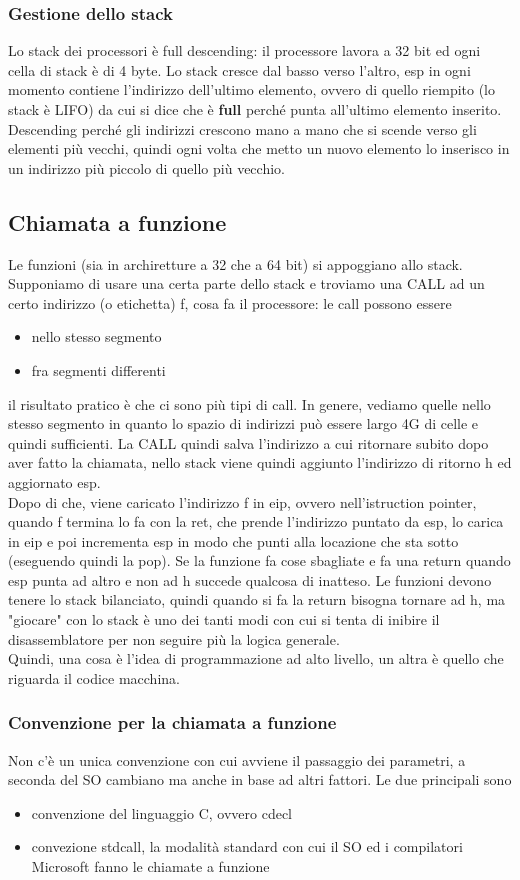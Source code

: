 \documentclass{article}
\begin{document}
\subsubsection{Gestione dello stack}
Lo stack dei processori è full descending: il processore lavora a 32 bit ed ogni cella di stack è di 4 byte. Lo stack cresce dal basso verso l'altro, esp in ogni momento contiene l'indirizzo dell'ultimo elemento, ovvero di quello riempito (lo stack è LIFO) da cui si dice che è \textbf{full} perché punta all'ultimo elemento inserito. Descending perché gli indirizzi crescono mano a mano che si scende verso gli elementi più vecchi, quindi ogni volta che metto un nuovo elemento lo inserisco in un indirizzo più piccolo di quello più vecchio.
\subsection{Chiamata a funzione}
Le funzioni (sia in archiretture a 32 che a 64 bit) si appoggiano allo stack. Supponiamo di usare una certa parte dello stack e troviamo una CALL ad un certo indirizzo (o etichetta) f, cosa fa il processore: le call possono essere
\begin{itemize}
\item nello stesso segmento
\item fra segmenti differenti
\end{itemize}
il risultato pratico è che ci sono più tipi di call. In genere, vediamo quelle nello stesso segmento in quanto lo spazio di indirizzi può essere largo 4G di celle e quindi sufficienti. La CALL quindi salva l'indirizzo a cui ritornare subito dopo aver fatto la chiamata, nello stack viene quindi aggiunto l'indirizzo di ritorno h ed aggiornato esp.\\ Dopo di che, viene caricato l'indirizzo f in eip, ovvero nell'istruction pointer, quando f termina lo fa con la \textsf{ret}, che prende l'indirizzo puntato da esp, lo carica in eip e poi incrementa esp in modo che punti alla locazione che sta sotto (eseguendo quindi la pop). Se la funzione fa cose sbagliate e fa una return quando esp punta ad altro e non ad h succede qualcosa di inatteso. Le funzioni devono tenere lo stack bilanciato, quindi quando si fa la return bisogna tornare ad h, ma "giocare" con lo stack è uno dei tanti modi con cui si tenta di inibire il disassemblatore per non seguire più la logica generale.\\ Quindi, una cosa è l'idea di programmazione ad alto livello, un altra è quello che riguarda il codice macchina.
\subsubsection{Convenzione per la chiamata a funzione}
Non c'è un unica convenzione con cui avviene il passaggio dei parametri, a seconda del SO cambiano ma anche in base ad altri fattori. Le due principali sono 
\begin{itemize}
\item convenzione del linguaggio C, ovvero cdecl
\item convezione stdcall, la modalità standard con cui il SO ed i compilatori Microsoft fanno le chiamate a funzione
\end{itemize}
\end{document}
